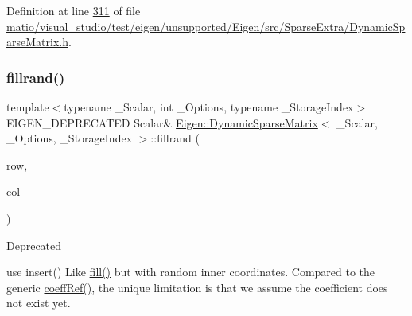 Definition at line \hyperlink{matio_2visual__studio_2test_2eigen_2unsupported_2_eigen_2src_2_sparse_extra_2_dynamic_sparse_matrix_8h_source_l00311}{311} of file \hyperlink{matio_2visual__studio_2test_2eigen_2unsupported_2_eigen_2src_2_sparse_extra_2_dynamic_sparse_matrix_8h_source}{matio/visual\+\_\+studio/test/eigen/unsupported/\+Eigen/src/\+Sparse\+Extra/\+Dynamic\+Sparse\+Matrix.\+h}.

\mbox{\label{class_eigen_1_1_dynamic_sparse_matrix_a6a5eb3c9d153d8ebdf4e0967321108e2}} 
\subsubsection{\texorpdfstring{fillrand()}{fillrand()}\hspace{0.1cm}{\footnotesize\ttfamily [2/2]}}
{\footnotesize\ttfamily template$<$typename \+\_\+\+Scalar, int \+\_\+\+Options, typename \+\_\+\+Storage\+Index$>$ \\
E\+I\+G\+E\+N\+\_\+\+D\+E\+P\+R\+E\+C\+A\+T\+ED Scalar\& \hyperlink{class_eigen_1_1_dynamic_sparse_matrix}{Eigen\+::\+Dynamic\+Sparse\+Matrix}$<$ \+\_\+\+Scalar, \+\_\+\+Options, \+\_\+\+Storage\+Index $>$\+::fillrand (\begin{DoxyParamCaption}\item[{\hyperlink{group___core___module_a554f30542cc2316add4b1ea0a492ff02}{Index}}]{row,  }\item[{\hyperlink{group___core___module_a554f30542cc2316add4b1ea0a492ff02}{Index}}]{col }\end{DoxyParamCaption})\hspace{0.3cm}{\ttfamily [inline]}}

\begin{DoxyRefDesc}{Deprecated}
\item[\hyperlink{deprecated__deprecated000043}{Deprecated}]use insert() Like \hyperlink{class_eigen_1_1_dynamic_sparse_matrix_a70c8f529b38fd5b7d93d6dfe1a122723}{fill()} but with random inner coordinates. Compared to the generic \hyperlink{class_eigen_1_1_dynamic_sparse_matrix_a17093cd39bd0e6ebd6250bc5feb61a0f}{coeff\+Ref()}, the unique limitation is that we assume the coefficient does not exist yet. \end{DoxyRefDesc}


